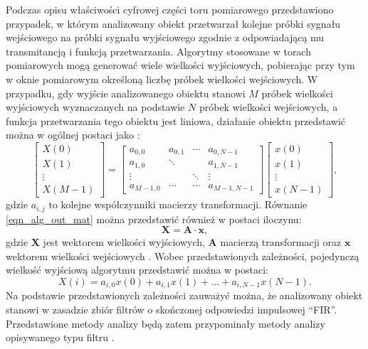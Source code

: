 Podczas opisu właściwości cyfrowej części toru pomiarowego przedstawiono przypadek, w którym analizowany obiekt przetwarzał kolejne próbki sygnału wejściowego na próbki sygnału wyjściowego zgodnie z odpowiadającą mu transmitancją i funkcją przetwarzania. Algorytmy stosowane w torach pomiarowych mogą generować wiele wielkości wyjściowych, pobierając przy tym w oknie pomiarowym określoną liczbę próbek wielkości wejściowych. W przypadku, gdy wyjście analizowanego obiektu stanowi $M$ próbek wielkości wyjściowych wyznaczanych na podstawie $N$ próbek wielkości wejściowych, a funkcja przetwarzania tego obiektu jest liniowa, działanie obiektu przedstawić można w ogólnej postaci jako \cite{jakubiec_algorithms, jakubiec_single}:
\begin{equation}
\begin{bmatrix}
X(0)        \\
X(1)        \\
\vdots      \\
X(M-1)
\end{bmatrix}
=
\begin{bmatrix}
a_{0, 0}   &   a_{0, 1} &   \cdots   &   a_{0, N-1}      \\
a_{1, 0}   &   \ddots   &            &   a_{1, N-1}      \\
\vdots     &            &   \ddots   &   \vdots          \\
a_{M-1, 0} &   \cdots   &   \cdots   &   a_{M-1, N-1}
\end{bmatrix}
\begin{bmatrix}
x(0)        \\
x(1)        \\
\vdots      \\
x(N-1)
\end{bmatrix}
\label{eqn_alg_out_mat},
\end{equation}
gdzie $a_{i,j}$ to kolejne współczynniki macierzy transformacji. Równanie \eqref{eqn_alg_out_mat} można przedstawić również w postaci iloczynu:
\begin{equation}
\mathbf{X} = \mathbf{A} \cdot \mathbf{x} \label{eqn_alg_out_mul},
\end{equation}
gdzie $\mathbf{X}$ jest wektorem wielkości wyjściowych, $\mathbf{A}$ macierzą transformacji oraz $\mathbf{x}$ wektorem wielkości wejściowych \cite{jakubiec_algorithms}. Wobec przedstawionych zależności, pojedynczą wielkość wyjściową algorytmu przedstawić można w postaci:
\begin{equation}
X(i) = a_{i, 0} x(0) + a_{i, 1} x(1) + \hdots + a_{i, N-1} x(N-1) \label{eqn_alg_out_single}.
\end{equation}
Na podstawie przedstawionych zależności zauważyć można, że analizowany obiekt stanowi w zasadzie zbiór filtrów o skończonej odpowiedzi impulsowej \enquote{FIR}. Przedstawione metody analizy będą zatem przypominały metody analizy opisywanego typu filtru \cite{mehrnia_fir}.

